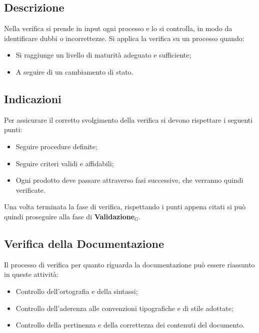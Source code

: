 \subsection{Descrizione}
Nella verifica si prende in input ogni processo e lo si controlla, in modo da identificare dubbi o incorrettezze.
Si applica la verifica su un processo quando:
\begin{itemize}
  \item Si raggiunge un livello di maturità adeguato e sufficiente;
  \item A seguire di un cambiamento di stato.
\end{itemize}

\subsection{Indicazioni}
Per assicurare il corretto svolgimento della verifica si devono rispettare i seguenti punti:
\begin{itemize}
  \item Seguire procedure definite;
  \item Seguire criteri validi e affidabili;
  \item Ogni prodotto deve passare attraverso fasi successive, che verranno quindi verificate.
\end{itemize}
Una volta terminata la fase di verifica, rispettando i punti appena citati si può quindi proseguire alla fase di \textbf{Validazione}$_G$.

\subsection{Verifica della Documentazione}
Il processo di verifica per quanto riguarda la documentazione può essere riassunto in queste attività:
\begin{itemize}
  \item Controllo dell'ortografia e della sintassi;
  \item Controllo dell'aderenza alle convenzioni tipografiche e di stile adottate;
  \item Controllo della pertinenza e della correttezza dei contenuti del documento.
\end{itemize}

